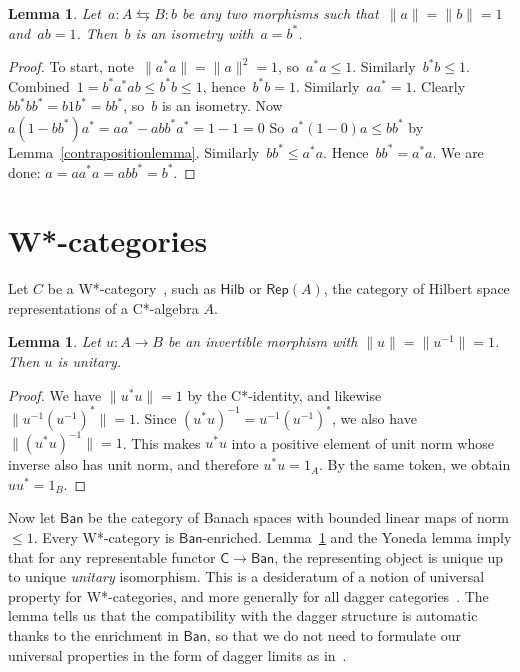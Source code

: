 \documentclass[reqno,T1]{amsproc}
\newcommand{\cat}[1]{\mathsf{#1}}		%
\newcommand{\Ban}{\mathsf{Ban}}			%
\newcommand{\Hilb}{\mathsf{Hilb}} 		%
\newcommand{\Rep}[1]{\mathsf{Rep}(#1)}		%
\newcommand{\id}[1]{1_{#1}}			%
\theoremstyle{plain}
\newtheorem{lem}[thm]{Lemma}
\theoremstyle{remark}
\numberwithin{equation}{section}
\begin{document}
\begin{lem}
Let~$a \colon A \leftrightarrows B \colon b$ be any two morphisms
    such that~$\|a \| = \| b\| = 1$ and~$ab=1$.
    Then~$b$ is an isometry with~$a=b^*$.
\end{lem}
\begin{proof}
    To start, note~$\|a ^*a\| = \|a\|^2 = 1$, so~$a^*a \leq 1$.
    Similarly~$b^*b \leq 1$.
    Combined~$1 = b^*a^*ab \leq b^*b \leq 1$, hence~$b^*b=1$.
    Similarly~$aa^*=1$.
    Clearly~$bb^*bb^* = b 1 b^* = bb^*$, so~$b$ is an isometry.
    Now~$a (1-bb^*) a^* = aa^* - abb^*a^* = 1-1=0$
    So~$a^* (1-0) a \leq bb^*$ by Lemma~\ref{contrapositionlemma}.
    Similarly~$bb^* \leq a^*a$. Hence~$bb^*=a^*a$.
    We are done: $a = aa^*a=abb^*=b^*$.
\end{proof}

\section{W*-categories}

Let $C$ be a W*-category~\cite{wstarcat}, such as $\Hilb$ or $\Rep{A}$, the category of Hilbert space representations of a C*-algebra $A$.


\begin{lem}
Let $u : A \to B$ be an invertible morphism with $\| u \| = \| u^{-1} \| = 1$. Then $u$ is unitary.
\label{unitaries}
\end{lem}


\begin{proof}
We have $\| u^* u \| = 1$ by the C*-identity, and likewise $\| u^{-1} (u^{-1})^* \| = 1$. Since $(u^* u)^{-1} = u^{-1} (u^{-1})^*$, we also have $\| (u^* u)^{-1} \| = 1$. This makes $u^* u$ into a positive element of unit norm whose inverse also has unit norm, and therefore $u^* u = \id{A}$. By the same token, we obtain $u u^* = \id{B}$.
\end{proof}

Now let $\Ban$ be the category of Banach spaces with bounded linear maps of norm $\leq 1$. Every W*-category is $\Ban$-enriched. Lemma~\ref{unitaries} and the Yoneda lemma imply that for any representable functor $\cat{C} \to \Ban$, the representing object is unique up to unique \emph{unitary} isomorphism. This is a desideratum of a notion of universal property for W*-categories, and more generally for all dagger categories~\cite{daglims}. The lemma tells us that the compatibility with the dagger structure is automatic thanks to the enrichment in $\Ban$, so that we do not need to formulate our universal properties in the form of dagger limits as in~\cite{daglims}.
\end{document}
